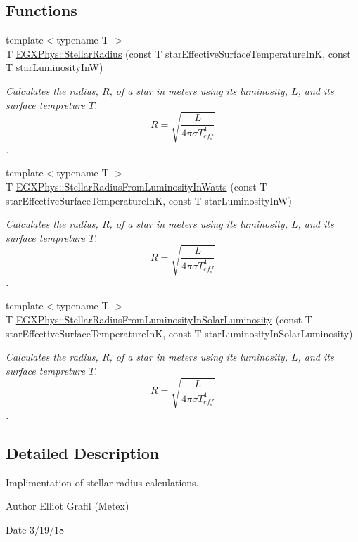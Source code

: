 \subsection*{Functions}
\begin{DoxyCompactItemize}
\item 
{\footnotesize template$<$typename T $>$ }\\T \mbox{\hyperlink{group___e_g_x_phys-_stellar_radius_ga612cd22c37341a1864cd2fc5c858e18e}{E\+G\+X\+Phys\+::\+Stellar\+Radius}} (const T star\+Effective\+Surface\+Temperature\+InK, const T star\+Luminosity\+InW)
\begin{DoxyCompactList}\small\item\em Calculates the radius, $R$, of a star in meters using its luminosity, $L$, and its surface tempreture $T$. \[R=\sqrt{\dfrac{L}{4\pi \sigma T_{eff}^4}}\]. \end{DoxyCompactList}\item 
{\footnotesize template$<$typename T $>$ }\\T \mbox{\hyperlink{group___e_g_x_phys-_stellar_radius_ga59f0d5d89a857d30bff4c93713ee5bd9}{E\+G\+X\+Phys\+::\+Stellar\+Radius\+From\+Luminosity\+In\+Watts}} (const T star\+Effective\+Surface\+Temperature\+InK, const T star\+Luminosity\+InW)
\begin{DoxyCompactList}\small\item\em Calculates the radius, $R$, of a star in meters using its luminosity, $L$, and its surface tempreture $T$. \[R=\sqrt{\dfrac{L}{4\pi \sigma T_{eff}^4}}\]. \end{DoxyCompactList}\item 
{\footnotesize template$<$typename T $>$ }\\T \mbox{\hyperlink{group___e_g_x_phys-_stellar_radius_ga49f0848777ba12cdfc78d112d82036ce}{E\+G\+X\+Phys\+::\+Stellar\+Radius\+From\+Luminosity\+In\+Solar\+Luminosity}} (const T star\+Effective\+Surface\+Temperature\+InK, const T star\+Luminosity\+In\+Solar\+Luminosity)
\begin{DoxyCompactList}\small\item\em Calculates the radius, $R$, of a star in meters using its luminosity, $L$, and its surface tempreture $T$. \[R=\sqrt{\dfrac{L}{4\pi \sigma T_{eff}^4}}\]. \end{DoxyCompactList}\end{DoxyCompactItemize}


\subsection{Detailed Description}
Implimentation of stellar radius calculations. 

\begin{DoxyAuthor}{Author}
Elliot Grafil (Metex) 
\end{DoxyAuthor}
\begin{DoxyDate}{Date}
3/19/18 
\end{DoxyDate}

